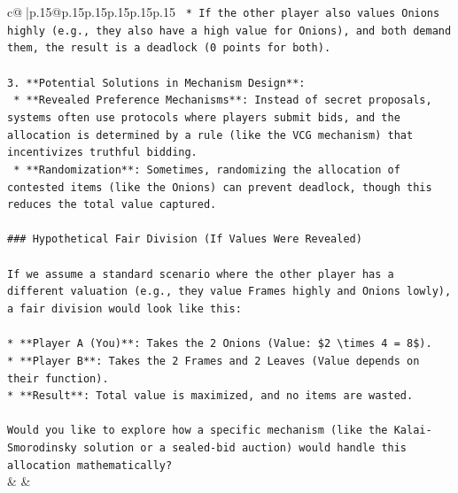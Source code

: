 \documentclass{article}
\begin{document}
{\begin{supertabular}{c@{$\;$}|p{.15\linewidth}@{}p{.15\linewidth}p{.15\linewidth}p{.15\linewidth}p{.15\linewidth}p{.15\linewidth}}
{{{\texttt{    *   If the other player also values Onions highly (e.g., they also have a high value for Onions), and both demand them, the result is a deadlock (0 points for both).} \\
\\ 
\texttt{3.  **Potential Solutions in Mechanism Design**:} \\
\texttt{    *   **Revealed Preference Mechanisms**: Instead of secret proposals, systems often use protocols where players submit bids, and the allocation is determined by a rule (like the VCG mechanism) that incentivizes truthful bidding.} \\
\texttt{    *   **Randomization**: Sometimes, randomizing the allocation of contested items (like the Onions) can prevent deadlock, though this reduces the total value captured.} \\
\\ 
\texttt{\#\#\# Hypothetical Fair Division (If Values Were Revealed)} \\
\\ 
\texttt{If we assume a standard scenario where the other player has a different valuation (e.g., they value Frames highly and Onions lowly), a fair division would look like this:} \\
\\ 
\texttt{*   **Player A (You)**: Takes the 2 Onions (Value: \$2 \textbackslash{}times 4 = 8\$).} \\
\texttt{*   **Player B**: Takes the 2 Frames and 2 Leaves (Value depends on their function).} \\
\texttt{*   **Result**: Total value is maximized, and no items are wasted.} \\
\\ 
\texttt{Would you like to explore how a specific mechanism (like the Kalai{-}Smorodinsky solution or a sealed{-}bid auction) would handle this allocation mathematically?} \\
            }
        }
    }
    & & \\ \\


\end{supertabular}}
\end{document}
